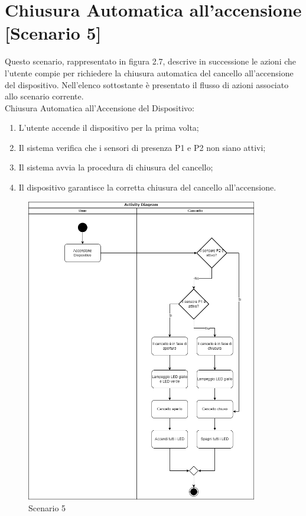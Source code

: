 \section{Chiusura Automatica all'accensione [Scenario 5]}
Questo scenario, rappresentato in figura 2.7, descrive in successione le azioni che l’utente compie per richiedere la chiusura automatica del cancello all'accensione del dispositivo.
Nell'elenco sottostante è presentato il flusso di azioni associato allo scenario corrente. \\

\noindent Chiusura Automatica all'Accensione del Dispositivo:

\begin{enumerate}
    \item L’utente accende il dispositivo per la prima volta;
    \item Il sistema verifica che i sensori di presenza P1 e P2 non siano attivi;
    \item Il sistema avvia la procedura di chiusura del cancello;
    \item Il dispositivo garantisce la corretta chiusura del cancello all'accensione.
\end{enumerate}


\begin{figure}[H]
    \centering
    \includegraphics[width=0.9\textwidth]{figures/scenario5.drawio.png}
    \caption{Scenario 5}
    \label{scenario5}
\end{figure}